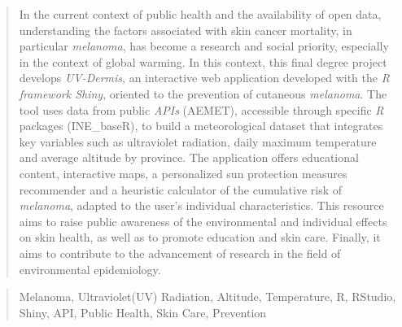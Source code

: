 \documentclass[a4paper,12pt,twoside]{memoir}
\begin{document}
\renewcommand*\abstractname{Abstract}
\begin{abstract}
In the current context of public health and the availability of open data, understanding the factors associated with skin cancer mortality, in particular \textit{melanoma}, has become a research and social priority, especially in the context of global warming. 
In this context, this final degree project develops \textit{UV-Dermis}, an interactive web application developed with the \textit{R} \textit{framework Shiny}, oriented to the prevention of cutaneous \textit{melanoma}. The tool uses data from public \textit{APIs} (AEMET), accessible through specific \textit{R} packages (INE\_baseR), to build a meteorological dataset that integrates key variables such as ultraviolet radiation, daily maximum temperature and average altitude by province. The application offers educational content, interactive maps, a personalized sun protection measures recommender and a heuristic calculator of the cumulative risk of \textit{melanoma}, adapted to the user's individual characteristics. 
This resource aims to raise public awareness of the environmental and individual effects on skin health, as well as to promote education and skin care. Finally, it aims to contribute to the advancement of research in the field of environmental epidemiology.

\end{abstract}

\renewcommand*\abstractname{Keywords}
\begin{abstract}
Melanoma, Ultraviolet(UV) Radiation, Altitude, Temperature, R,
RStudio, Shiny, API, Public Health, Skin Care, Prevention
    
\end{abstract}


\cleardoublepage

\tableofcontents

\cleardoublepage

\listoffigures

\cleardoublepage

\listoftables
\cleardoublepage


\mainmatter

\clearpage

\clearpage

\clearpage

\clearpage

\clearpage

\clearpage

\clearpage



\end{document}
